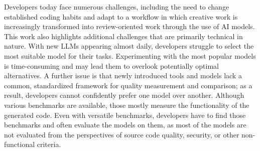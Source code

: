 


Developers today face numerous challenges, including the need to change established coding habits and adapt to a workflow in which creative work is increasingly transformed into review-oriented work through the use of AI models.
This work also highlights additional challenges that are primarily technical in nature.
With new LLMs appearing almost daily, developers struggle to select the most suitable model for their tasks.
Experimenting with the most popular models is time-consuming and may lead them to overlook potentially optimal alternatives.
A further issue is that newly introduced tools and models lack a common, standardized framework for quality measurement and comparison; as a result, developers cannot confidently prefer one model over another.
Although various benchmarks are available, those mostly measure the functionality of the generated code.
Even with versatile benchmarks, developers have to find those benchmarks and often evaluate the models on them, as most of the models are not evaluated from the perspectives of source code quality, security, or other non-functional criteria.

